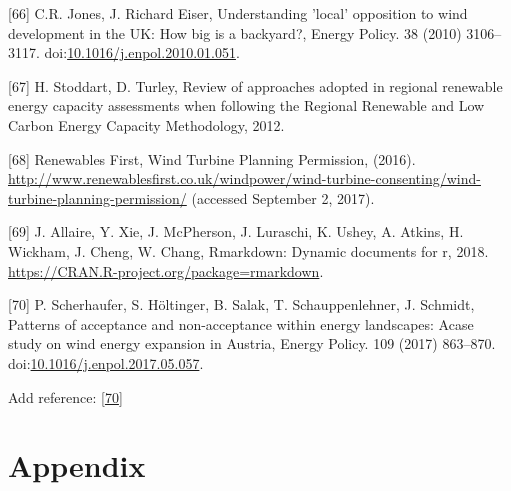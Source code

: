 \documentclass[a4paper,]{article}
\theoremstyle{definition}
\theoremstyle{definition}
\theoremstyle{definition}
\theoremstyle{remark}
\begin{document}
\hypertarget{ref-Jones2010a}{}
{[}66{]} C.R. Jones, J. Richard Eiser, Understanding 'local' opposition
to wind development in the UK: How big is a backyard?, Energy Policy. 38
(2010) 3106--3117.
doi:\href{https://doi.org/10.1016/j.enpol.2010.01.051}{10.1016/j.enpol.2010.01.051}.

\hypertarget{ref-Stoddart2012}{}
{[}67{]} H. Stoddart, D. Turley, Review of approaches adopted in
regional renewable energy capacity assessments when following the
Regional Renewable and Low Carbon Energy Capacity Methodology, 2012.

\hypertarget{ref-RF2016}{}
{[}68{]} Renewables First, Wind Turbine Planning Permission, (2016).
\url{http://www.renewablesfirst.co.uk/windpower/wind-turbine-consenting/wind-turbine-planning-permission/}
(accessed September 2, 2017).

\hypertarget{ref-R-rmarkdown}{}
{[}69{]} J. Allaire, Y. Xie, J. McPherson, J. Luraschi, K. Ushey, A.
Atkins, H. Wickham, J. Cheng, W. Chang, Rmarkdown: Dynamic documents for
r, 2018. \url{https://CRAN.R-project.org/package=rmarkdown}.

\hypertarget{ref-Scherhaufer2017}{}
{[}70{]} P. Scherhaufer, S. Höltinger, B. Salak, T. Schauppenlehner, J.
Schmidt, Patterns of acceptance and non-acceptance within energy
landscapes: Acase study on wind energy expansion in Austria, Energy
Policy. 109 (2017) 863--870.
doi:\href{https://doi.org/10.1016/j.enpol.2017.05.057}{10.1016/j.enpol.2017.05.057}.

Add reference: {[}\protect\hyperlink{ref-Scherhaufer2017}{70}{]}

\newpage

\section*{Appendix}\label{appendix}
\end{document}
